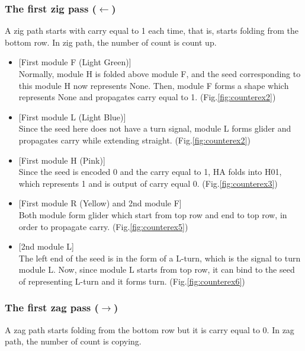 \documentclass[runningheads]{llncs}
\begin{document}
\subsubsection{The first zig pass ($\leftarrow$)}
A zig path starts with carry equal to 1 each time, that is, starts folding from the bottom row.
In zig path, the number of count is count up.
\begin{itemize}
\item{[First module F (Light Green)]} \\Normally, module H is folded above module F, and the seed corresponding to this module H now represents None.
Then, module F forms a shape which represents None and propagates carry equal to 1. (Fig.\ref{fig:counterex2})

\item{[First module L (Light Blue)]} \\Since the seed here does not have a turn signal, module L forms glider and propagates carry while extending straight. (Fig.\ref{fig:counterex2})

\item{[First module H (Pink)]} \\Since the seed is encoded 0 and the carry equal to 1, HA folds into H01, which represents 1 and is output of carry equal 0. (Fig.\ref{fig:counterex3})

\item{[First module R (Yellow) and 2nd module F]} \\Both module form glider which start from top row and end to top row, in order to propagate carry. (Fig.\ref{fig:counterex5})

\item{[2nd module L]} \\The left end of the seed is in the form of a L-turn, which is the signal to turn module L.
Now, since module L starts from top row, it can bind to the seed of representing L-turn and it forms turn. (Fig.\ref{fig:counterex6})
\end{itemize}

\subsubsection{The first zag pass ($\rightarrow$)}
A zag path starts folding from the bottom row but it is carry equal to 0.
In zag path, the number of count is copying.
\end{document}
